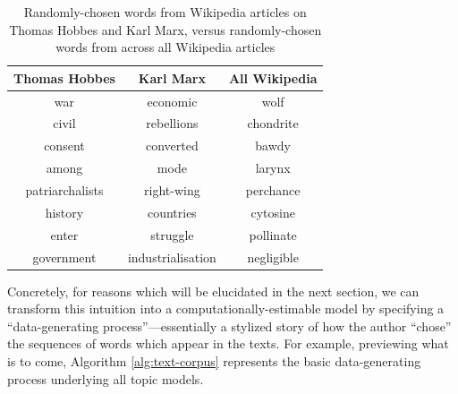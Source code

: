 \documentclass[11pt]{article}
\begin{document}
\begin{table}[ht!]
	\centering
	\begin{tabular}{ccc}
		\toprule
		\textbf{Thomas Hobbes} & \textbf{Karl Marx} & \textbf{All Wikipedia} \\
		\midrule
		war & economic & wolf \\
		civil & rebellions & chondrite \\
		consent & converted & bawdy \\
		among & mode & larynx \\
		patriarchalists & right-wing & perchance \\
		history & countries & cytosine \\
		enter & struggle & pollinate \\
		government & industrialisation & negligible \\
		\bottomrule
	\end{tabular}
	\caption{Randomly-chosen words from Wikipedia articles on Thomas Hobbes and Karl Marx, versus randomly-chosen words from across all Wikipedia articles}
	\label{tab:hobbes-wiki}
\end{table}

Concretely, for reasons which will be elucidated in the next section, we can transform this intuition into a computationally-estimable model by specifying a ``data-generating process''---essentially a stylized story of how the author ``chose'' the sequences of words which appear in the texts. For example, previewing what is to come, Algorithm \ref{alg:text-corpus} represents the basic data-generating process underlying all topic models.
\end{document}

